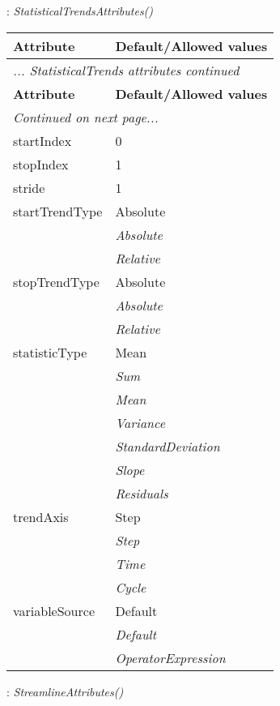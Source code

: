 \documentclass[10pt,a4paper]{report}
\begin{document}
\newpage

{}
: {\it StatisticalTrendsAttributes() }\\[-3mm]

\begin{longtable}{ll}
{\bf Attribute} & {\bf Default/Allowed values} \\
\hline \hline
\endfirsthead
\multicolumn{2}{l}{{\it ... StatisticalTrends attributes continued}} \\
{\bf Attribute} & {\bf Default/Allowed values} \\
\hline \hline
\endhead
\hline
\multicolumn{2}{l}{{\it Continued on next page...}} \\
\endfoot
\hline
\endlastfoot

startIndex  &  0 \\
stopIndex  &  1 \\
stride  &  1 \\
startTrendType  &  Absolute   \\
 & {\it  Absolute} \\
 & {\it  Relative} \\
stopTrendType  &  Absolute   \\
 & {\it  Absolute} \\
 & {\it  Relative} \\
statisticType  &  Mean   \\
 & {\it  Sum} \\
 & {\it  Mean} \\
 & {\it  Variance} \\
 & {\it  StandardDeviation} \\
 & {\it  Slope} \\
 & {\it  Residuals} \\
trendAxis  &  Step   \\
 & {\it  Step} \\
 & {\it  Time} \\
 & {\it  Cycle} \\
variableSource  &  Default   \\
 & {\it  Default} \\
 & {\it  OperatorExpression} \\
\end{longtable}

\newpage

{}
: {\it StreamlineAttributes() }\\[-3mm]
\end{document}
